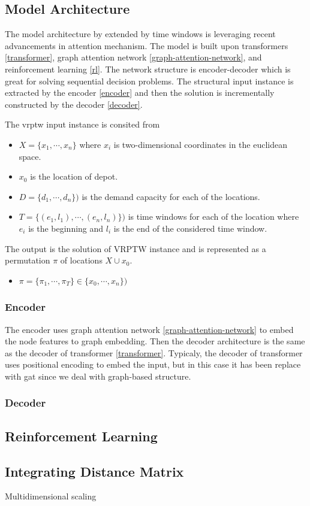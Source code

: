     \subsection{Model Architecture}
    The model architecture by \cite{attention-route} extended by time windows is leveraging recent advancements in attention mechanism. The model is built upon transformers \ref{transformer}, graph attention network \ref{graph-attention-network}, and reinforcement learning \ref{rl}. The network structure is encoder-decoder which is great for solving sequential decision problems. The structural input instance is extracted by the encoder \ref{encoder} and then the solution is incrementally constructed by the decoder \ref{decoder}.
    
    The \gls{vrptw} input instance is consited from
    \begin{itemize}
        \item $X = \{x_1, \cdots, x_n\}$ where $x_i$ is two-dimensional coordinates in the euclidean space.
        \item $x_0$ is the location of depot.
        \item $D = \{d_1, \cdots, d_n\})$ is the demand capacity for each of the locations.
        \item $T = \{(e_1, l_1), \cdots, (e_n, l_n)\})$ is time windows for each of the location where $e_i$ is the beginning and $l_i$ is the end of the considered time window.
    \end{itemize}
    
    The output is the solution of VRPTW instance and is represented as a permutation $\pi$ of locations $X \cup x_0$.
    \begin{itemize}
        \item $\pi = \{\pi_1, \cdots, \pi_T\} \in \{x_0, \cdots, x_n\})$ 
    \end{itemize}
    
    \subsubsection{Encoder}\label{vrptw-encoder}
    The encoder uses graph attention network \ref{graph-attention-network} to embed the node features to graph embedding. Then the decoder architecture is the same as the decoder of transformer \ref{transformer}. Typicaly, the decoder of transformer uses positional encoding \cite{positional-encoding} to embed the input, but in this case it has been replace with \gls{gat} since we deal with graph-based structure.
    
    
    
    \subsubsection{Decoder}\label{vrptw-decoder}
        
    \subsection{Reinforcement Learning}\label{vrptw-rl}
        
    \subsection{Integrating Distance Matrix}
    Multidimensional scaling
